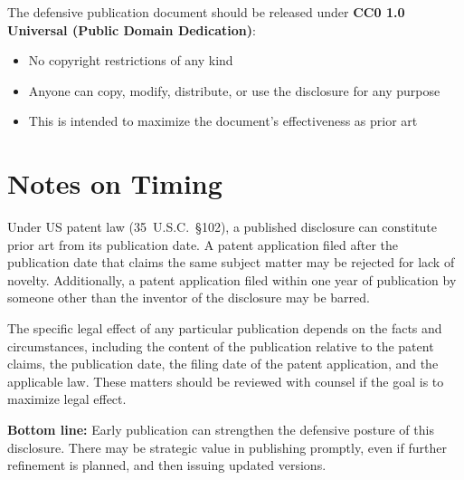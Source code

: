 \documentclass[12pt,a4paper]{article}
\begin{document}
The defensive publication document should be released under \textbf{CC0 1.0 Universal (Public Domain Dedication)}:
\begin{itemize}
  \item No copyright restrictions of any kind
  \item Anyone can copy, modify, distribute, or use the disclosure for any purpose
  \item This is intended to maximize the document's effectiveness as prior art
\end{itemize}

\section{Notes on Timing}

Under US patent law (35~U.S.C.~\S102), a published disclosure can constitute prior art from its publication date. A patent application filed after the publication date that claims the same subject matter may be rejected for lack of novelty. Additionally, a patent application filed within one year of publication by someone other than the inventor of the disclosure may be barred.

The specific legal effect of any particular publication depends on the facts and circumstances, including the content of the publication relative to the patent claims, the publication date, the filing date of the patent application, and the applicable law. These matters should be reviewed with counsel if the goal is to maximize legal effect.

\textbf{Bottom line:} Early publication can strengthen the defensive posture of this disclosure. There may be strategic value in publishing promptly, even if further refinement is planned, and then issuing updated versions.
\end{document}
